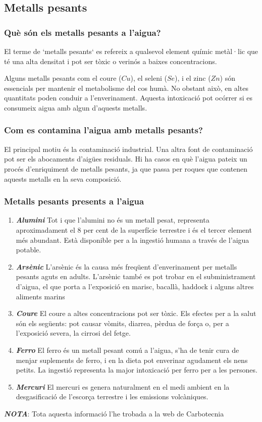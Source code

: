 \subsection{Metalls pesants} \label{subsec:metallspesats}
\subsubsection{Què són els metalls pesants a l’aigua?}
El terme de `metalls pesants` es refereix a qualsevol element químic metàl·lic que té una alta densitat i pot ser tòxic o verinós a baixes concentracions.

Alguns metalls pesants com el coure ($Cu$), el seleni ($Se$), i el zinc ($Zn$) són essencials per mantenir el metabolisme del cos humà. No obstant això, en altes quantitats poden conduir a l'enverinament. Aquesta intoxicació pot ocórrer si es consumeix aigua amb algun d’aquests metalls.
\subsubsection{Com es contamina l’aigua amb metalls pesants?}
El principal motiu és la contaminació industrial. Una altra font de contaminació pot ser els abocaments d'aigües residuals. Hi ha casos en què l’aigua pateix un procés d’enriquiment de metalls pesants, ja que passa per roques que contenen aquests metalls en la seva composició.
\subsubsection{Metalls pesants presents a l'aigua}
\begin{enumerate}
 \item \textit{\textbf{Alumini}}
 Tot i que l'alumini no és un metall pesat, representa aproximadament el 8 per cent de la superfície terrestre i és el tercer element més abundant. Està disponible per a la ingestió humana a través de l'aigua potable.
 \item \textit{\textbf{Arsènic}}
 L'arsènic és la causa més freqüent d'enverinament per metalls pesants aguts en adults. L'arsènic també es pot trobar en el subministrament d'aigua, el que porta a l'exposició en marisc, bacallà, haddock i alguns altres aliments marins
 \item \textit{\textbf{Coure}}
 El coure a altes concentracions pot ser tòxic. Els efectes per a la salut són els següents: pot causar vòmits, diarrea, pèrdua de força o, per a l'exposició severa, la cirrosi del fetge.
 \item \textit{\textbf{Ferro}}
 El ferro és un metall pesant comú a l'aigua, s'ha de tenir cura de menjar suplements de ferro, i en la dieta pot enverinar agudament els nens petits. La ingestió representa la major intoxicació per ferro per a les persones.
 \item \textit{\textbf{Mercuri}}
 El mercuri es genera naturalment en el medi ambient en la desgasificació de l'escorça terrestre i les emissions volcàniques.
\end{enumerate}
\textit{\textbf{NOTA}}: Tota aquesta informació l'he trobada a la web de Carbotecnia \cite{Carbotecnia}
